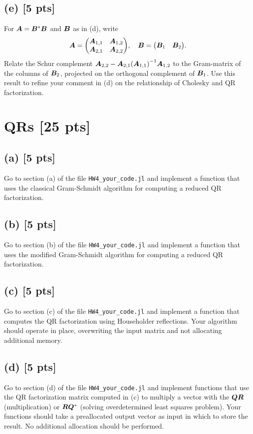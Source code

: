 \documentclass[twoside,10pt]{article}
\begin{document}
\subsection*{(e) [5 pts]} 
For $\bm{A} = \bm{B}^* \bm{B}$ and $\bm{B}$ as in (d), write 
\begin{equation}
\mtx{A} = 
\begin{pmatrix}
 \mtx{A}_{1,1}& \mtx{A}_{1,2} \\
 \mtx{A}_{2,1}& \mtx{A}_{2,2} 
\end{pmatrix}, 
\quad 
\mtx{B} = 
\begin{pmatrix}
 \mtx{B}_{1} &  \mtx{B}_{2} 
\end{pmatrix}. 
\end{equation}
Relate the Schur complement $\mtx{A}_{2,2} - \mtx{A}_{2,1} \left(\mtx{A}_{1, 1}\right)^{-1} \mtx{A}_{1,2}$ to the Gram-matrix of the columns of $\bm{B}_2$, projected on the orthogonal complement of $\bm{B}_1$.
Use this result to refine your comment in (d) on the relationship of Cholesky and QR factorization. 

\section{QRs [25 pts]}
\subsection*{(a) [5 pts]} 
Go to section (a) of the file \texttt{HW4\_your\_code.jl} and implement a function that uses the classical Gram-Schmidt algorithm for computing a reduced QR factorization. 

\subsection*{(b) [5 pts]} 
Go to section (b) of the file \texttt{HW4\_your\_code.jl} and implement a function that uses the modified Gram-Schmidt algorithm for computing a reduced QR factorization. 


\subsection*{(c) [5 pts]}
Go to section (c) of the file \texttt{HW4\_your\_code.jl} and implement a function that computes the QR factorization using Householder reflections. 
Your algorithm should operate in place, overwriting the input matrix and not allocating additional memory. 


\subsection*{(d) [5 pts]}
Go to section (d) of the file \texttt{HW4\_your\_code.jl} and implement functions that use the QR factorization matrix computed in (c) to multiply a vector with the $\bm{Q} \bm{R}$ (multiplication) or $\bm{R}\bm{Q}^*$ (solving overdetermined least squares problem). 
Your functions should take a preallocated output vector as input in which to store the result. 
No additional allocation should be performed. 
\end{document}
